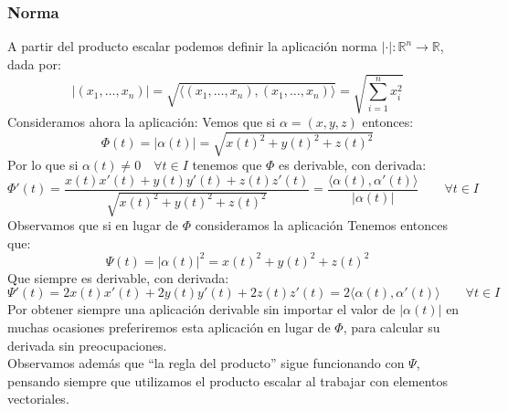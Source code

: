 \subsubsection{Norma}
\noindent
A partir del producto escalar podemos definir la aplicación norma $|\cdot |:\mathbb{R}^n\to\mathbb{R}$, dada por:
\begin{equation*}
    |(x_1,\ldots,x_n)| = \sqrt{\langle (x_1,\ldots,x_n),(x_1,\ldots,x_n) \rangle } = \sqrt{\sum_{i=1}^{n}x_i^2}
\end{equation*}
Consideramos ahora la aplicación:
Vemos que si $\alpha=(x,y,z)$ entonces:
\begin{equation*}
    \Phi(t) = |\alpha(t)| = \sqrt{x(t)^2 + y(t)^2 + z(t)^2}
\end{equation*}
Por lo que si $\alpha(t)\neq 0 \quad \forall t\in I$ tenemos que $\Phi$ es derivable, con derivada:
\begin{equation*}
    \Phi'(t) = \frac{x(t)x'(t)+y(t)y'(t)+z(t)z'(t)}{\sqrt{x(t)^2 + y(t)^2 + z(t)^2}} = \frac{\langle \alpha(t),\alpha'(t) \rangle }{|\alpha(t)|} \qquad \forall t\in I
\end{equation*}
Observamos que si en lugar de $\Phi$ consideramos la aplicación
Tenemos entonces que:
\begin{equation*}
    \Psi(t) = |\alpha(t)|^2 = x(t)^2 + y(t)^2 + z(t)^2
\end{equation*}
Que siempre es derivable, con derivada:
\begin{equation*}
    \Psi'(t) = 2x(t)x'(t) + 2y(t)y'(t) + 2z(t)z'(t) = 2\langle \alpha(t),\alpha'(t) \rangle \qquad \forall t\in I
\end{equation*}
Por obtener siempre una aplicación derivable sin importar el valor de $|\alpha(t)|$ en muchas ocasiones preferiremos esta aplicación en lugar de $\Phi$, para calcular su derivada sin preocupaciones.\\

\noindent
Observamos además que ``la regla del producto'' sigue funcionando con $\Psi$, pensando siempre que utilizamos el producto escalar al trabajar con elementos vectoriales.

